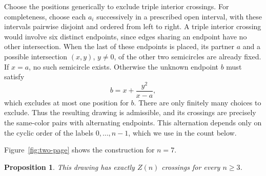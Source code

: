 \documentclass[11pt,a4paper]{article}
\newtheorem{proposition}[theorem]{Proposition}
\theoremstyle{remark}
\numberwithin{equation}{section}
\begin{document}
Choose the positions generically to exclude triple interior
crossings. For completeness, choose each \(a_i\) successively in a
prescribed open interval, with these intervals pairwise disjoint
and ordered from left to right. A triple interior crossing would
involve six distinct endpoints, since edges sharing an endpoint
have no other intersection. When the last of these endpoints is
placed, its partner \(a\) and a possible intersection \((x,y)\),
\(y\ne0\), of the other two semicircles are already fixed. If
\(x=a\), no such semicircle exists. Otherwise the unknown endpoint
\(b\) must satisfy
\[
 b=x+\frac{y^2}{x-a},
\]
which excludes at most one position for \(b\). There are only finitely many choices
to exclude. Thus the resulting drawing is admissible, and its
crossings are precisely the same-color pairs with alternating
endpoints. This alternation depends only on the cyclic order of the
labels \(0,\ldots,n-1\), which we use in the count below.

Figure~\ref{fig:two-page} shows the construction for \(n=7\).


\begin{proposition}\label{prop:upper}
This drawing has exactly \(Z(n)\) crossings for every \(n\ge3\).
\end{proposition}
\end{document}
